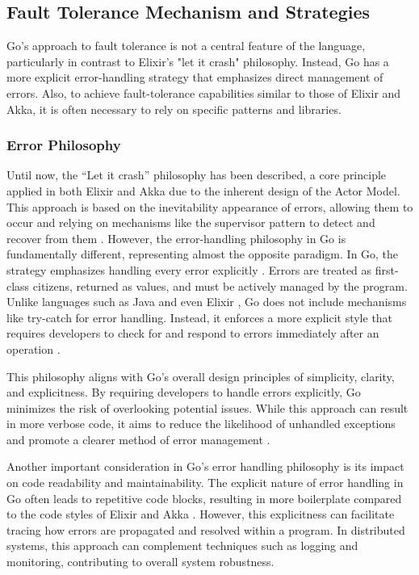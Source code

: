 \subsection{Fault Tolerance Mechanism and Strategies}

Go's approach to fault tolerance is not a central feature of the language, particularly in contrast to Elixir's "let it crash" philosophy. Instead, Go has a more explicit error-handling strategy that emphasizes direct management of errors. Also, to achieve fault-tolerance capabilities similar to those of Elixir and Akka, it is often necessary to rely on specific patterns and libraries.

\subsubsection{Error Philosophy}

Until now, the “Let it crash” philosophy has been described, a core principle applied in both Elixir and Akka due to the inherent design of the Actor Model. This approach is based on the inevitability appearance of errors, allowing them to occur and relying on mechanisms like the supervisor pattern to detect and recover from them \cite{Armstrong2013}. However, the error-handling philosophy in Go is fundamentally different, representing almost the opposite paradigm. In Go, the strategy emphasizes handling every error explicitly \cite{Kennedy2016,go-docs}. Errors are treated as first-class citizens, returned as values, and must be actively managed by the program. Unlike languages such as Java and even Elixir \cite{elixir-docs-hexdocs}, Go does not include mechanisms like try-catch for error handling. Instead, it enforces a more explicit style that requires developers to check for and respond to errors immediately after an operation \cite{Cox-Buday2017}.

This philosophy aligns with Go’s overall design principles of simplicity, clarity, and explicitness. By requiring developers to handle errors explicitly, Go minimizes the risk of overlooking potential issues. While this approach can result in more verbose code, it aims to reduce the likelihood of unhandled exceptions and promote a clearer method of error management \cite{Kennedy2016, go-docs}.

Another important consideration in Go’s error handling philosophy is its impact on code readability and maintainability. The explicit nature of error handling in Go often leads to repetitive code blocks, resulting in more boilerplate compared to the code styles of Elixir and Akka \cite{Kennedy2016, go-docs}. However, this explicitness can facilitate tracing how errors are propagated and resolved within a program. In distributed systems, this approach can complement techniques such as logging and monitoring, contributing to overall system robustness.


